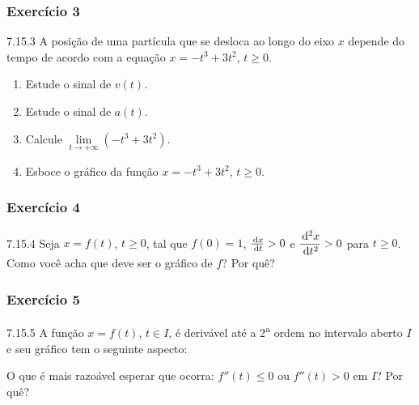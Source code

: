 \subsubsection*{Exercício 3}
\begin{exercicio}[3]{7.15.3}
A posição de uma partícula que se desloca ao longo do eixo $x$ depende do tempo de acordo com a equação $x = -t^3 + 3t^2$, $t \ge 0$.
\begin{enumerate}[label=\alph*)]
    \item Estude o sinal de $v(t)$.
    \item Estude o sinal de $a(t)$.
    \item Calcule $\lim\limits_{t \to +\infty} (-t^3 + 3t^2)$.
    \item Esboce o gráfico da função $x = -t^3 + 3t^2$, $t \ge 0$.
\end{enumerate}
\end{exercicio}

\subsubsection*{Exercício 4}
\begin{exercicio}[4]{7.15.4}
Seja $x = f(t)$, $t \ge 0$, tal que $f(0) = 1$, $\frac{\,\mathrm{d} x}{\,\mathrm{d} t} > 0$ e $\dfrac{\,\mathrm{d}^2 x}{\,\mathrm{d} t^2} > 0$ para $t \ge 0$. Como você acha que deve ser o gráfico de $f$? Por quê?
\end{exercicio}

\subsubsection*{Exercício 5}
\begin{exercicio}[5]{7.15.5}
A função $x = f(t)$, $t \in I$, é derivável até a 2\textsuperscript{a} ordem no intervalo aberto $I$ e seu gráfico tem o seguinte aspecto:

\begin{center}
\end{center}

O que é mais razoável esperar que ocorra: $f''(t) \le 0$ ou $f''(t) > 0$ em $I$? Por quê?
\end{exercicio}

